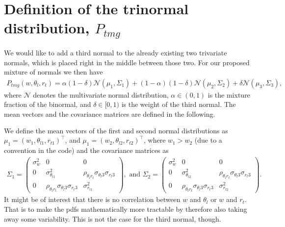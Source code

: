 \section{Definition of the trinormal distribution, $P_{tmg}$}
\label{sec:definition-of-the-trinormal-distribution-p_tmg}

We would like to add a third normal to the already existing two trivariate normals,
which is placed right in the middle between those two.
For our proposed mixture of normals we then have
\begin{align}
    \label{eq:normal_mix_pdf}
    P_{tmg}(w, \theta_l, r_t)
    = \alpha (1-\delta) \mathcal{N}(\mu_1, \Sigma_1)
    + (1-\alpha) (1-\delta) \mathcal{N}(\mu_2, \Sigma_2)
    + \delta \mathcal{N}(\mu_3, \Sigma_3),
\end{align}
where $\mathcal{N}$ denotes the multivariate normal distribution,
$\alpha \in (0,1)$ is the mixture fraction of the binormal,
and $\delta \in [0,1)$ is the weight of the third normal.
The mean vectors and the covariance matrices are defined in the following.

We define the mean vectors of the first
and second normal distributions as $\mu_1 = (w_1, \theta_{l1}, r_{t1})^\top$,
and $\mu_1 = (w_2, \theta_{l2}, r_{t2})^\top$,
where $w_1 > w_2$ (due to a convention in the code) and the covariance matrices as
\begin{align}
    \Sigma_1 =
    \begin{pmatrix}
        \sigma_w^2 & 0                                                      & 0                                                      \\
        0          & \sigma_{\theta_{l1}}^2                                 & \rho_{\theta_l r_t} \sigma_{\theta_l 3} \sigma_{r_t 3} \\
        0          & \rho_{\theta_l r_t} \sigma_{\theta_l 3} \sigma_{r_t 3} & \sigma_{r_{t1}}^2
    \end{pmatrix},
    \text{ and }
    \Sigma_2 =
    \begin{pmatrix}
        \sigma_w^2 & 0                                                      & 0                                                      \\
        0          & \sigma_{\theta_{l2}}^2                                 & \rho_{\theta_l r_t} \sigma_{\theta_l 3} \sigma_{r_t 3} \\
        0          & \rho_{\theta_l r_t} \sigma_{\theta_l 3} \sigma_{r_t 3} & \sigma_{r_{t2}}^2
    \end{pmatrix}.
\end{align}
It might be of interest that there is no correlation between $w$ and $\theta_l$ or $w$ and $r_t$.
That is to make the \glspl{pdf} mathematically more tractable by therefore also taking away some variability.
This is not the case for the third normal, though.

